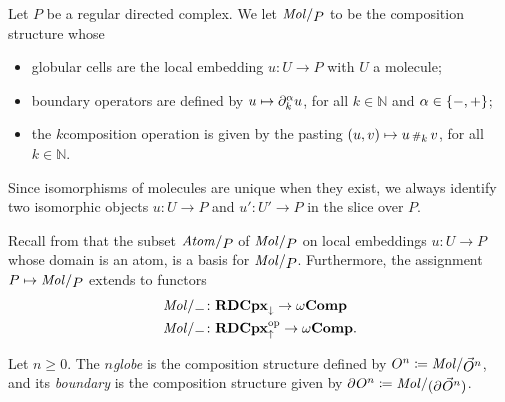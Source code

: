 \begin{dfn} 
    Let \( P \) be a regular directed complex.
    We let \( \molecin{P} \) to be the composition structure whose
    \begin{itemize}
        \item globular cells are the local embedding \( u \colon U \to P \) with \( U \) a molecule;
        \item boundary operators are defined by \( u \mapsto \partial_{k}^{ \alpha} u \), for all \( k \in \mathbb{N} \) and \( \alpha \in \left\{ {-, +} \right\} \);
        \item the \( k \)\nbd composition operation is given by the pasting \( (u, v) \mapsto u \,{\scriptstyle\#}_{k}\, v \), for all \( k \in \mathbb{N} \). 
    \end{itemize}    
\end{dfn}

\begin{rmk}
    Since isomorphisms of molecules are unique when they exist, we always identify two isomorphic objects \( u \colon U \to P \) and \( u' \colon U' \to P \) in the slice over \( P \).
\end{rmk}

\noindent Recall from \cite[Section 5.2, Section 6]{hadzihasanovic2024combinatorics} that the subset \( \atomin{P} \) of \( \molecin{P} \) on local embeddings \( u \colon U \to P \) whose domain is an atom, is a basis for \( \molecin{P} \).
Furthermore, the assignment \( P \mapsto \molecin{P} \) extends to functors
\begin{align*}
    \molecin{-} &\colon \rdcpxmap \to \Comp \\
    \molecin{-} &\colon \opp{\rdcpxcomap} \to \Comp. \\    
\end{align*} 

\begin{dfn} [Globe]
    Let \( n \geq 0 \).
    The \emph{\( n \)\nbd globe} is the composition structure defined by \( \globe{n} \eqdef \molecin{\dglobe{n}} \), and its \emph{boundary} is the composition structure given by \( \bd{}{}\globe{n} \eqdef \molecin{(\bd{}{}\dglobe{n})} \).
\end{dfn}

